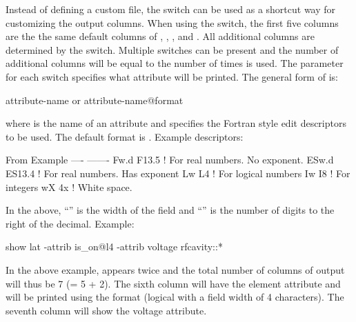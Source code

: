 {{{{{Instead of defining a custom file, the  switch can be used as a
shortcut way for customizing the output columns.  When using the  switch,
the first five columns are the the same default columns of , ,
,  and . All additional columns are determined by the
 switch. Multiple  switches can be present and the number of
additional columns will be equal to the number of times  is used.  The
 parameter for each  switch specifies what attribute will be
printed.  The general form of  is:
\begin{example}
  attribute-name         or
  attribute-name@format
\end{example}
where  is the name of an attribute and  specifies the Fortran style
edit descriptors to be used. The default format is . Example descriptors:
\begin{example}
  From   Example
  ----   -------
  Fw.d   F13.5    ! For real numbers. No exponent. 
  ESw.d  ES13.4   ! For real numbers. Has exponent
  Lw     L4       ! For logical numbers
  Iw     I8       ! For integers
  wX     4x       ! White space. 
\end{example}
In the above, ``'' is the width of the field and ``'' is the number of digits to
the right of the decimal. Example:
\begin{example}
  show lat -attrib is_on@l4 -attrib voltage rfcavity::*
\end{example}
In the above example,  appears twice and the total number of columns of output will
thus be 7 (= 5 + 2). The sixth column will have the  element attribute and will be printed
using the  format (logical with a field width of 4 characters). The seventh column will show
the voltage attribute.

}}}}}
